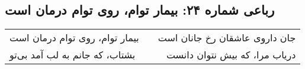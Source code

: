 \begin{center}
\section*{رباعی شماره ۲۴: بیمار توام، روی توام درمان است}
\label{sec:024}
\begin{longtable}{l p{0.5cm} r}
بیمار توام، روی توام درمان است
&&
جان داروی عاشقان رخ جانان است
\\
بشتاب، که جانم به لب آمد بی‌تو
&&
دریاب مرا، که بیش نتوان دانست
\\
\end{longtable}
\end{center}

